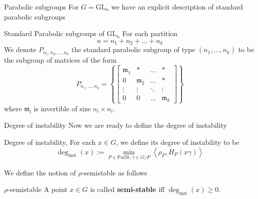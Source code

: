 \documentclass[pdf]{beamer}
\begin{document}
\begin{frame}{Parabolic subgroups}
    For $G =\text{GL}_n$ we have an explicit description of standard parabolic subgroups
    \pause\begin{block}{Standard Parabolic subgroups of $\text{GL}_n$}
        For each partition
        $$n = n_1+n_2+\ldots+n_k$$
        We denote $P_{n_1,n_2,\ldots,n_k}$ the standard parabolic subgroup of type $(n_1,\ldots, n_k)$ to be the subgroup of
        matrices of the form
        \[P_{n_1,\ldots, n_k} = \left\lbrace \begin{bmatrix}
                \mathfrak{m}_1 & \ast           & \ldots & \ast           \\
                0              & \mathfrak{m}_2 & \ldots & \ast           \\
                \vdots         & \vdots         & \ddots & \vdots         \\
                0              & 0              & \ldots & \mathfrak{m}_k
            \end{bmatrix} \right\rbrace\]
        where $\mathfrak{m_i}$ is invertible of size $n_i \times n_i$.
    \end{block}
\end{frame}
\begin{frame}{Degree of instability}
    Now we are ready to define the degree of instability
    \begin{block}{Degree of instability, \cite{chaudouard2016variante}}
        For each $x \in G$, we define its degree of instability to be
        \[\deg_{\text{inst}}(x):= \min_{P \in \text{ParSt}, \gamma \in G/P}\left\langle\rho_P, H_P(x\gamma) \right\rangle \]
    \end{block}\pause
    We define the notion of $\rho$-semistable as follows
    \begin{block}{$\rho$-semistable}
        A point $x \in G$ is called \textbf{semi-stable} iff $\deg_{\text{inst}}(x) \ge 0$.
    \end{block}
\end{frame}
\end{document}
